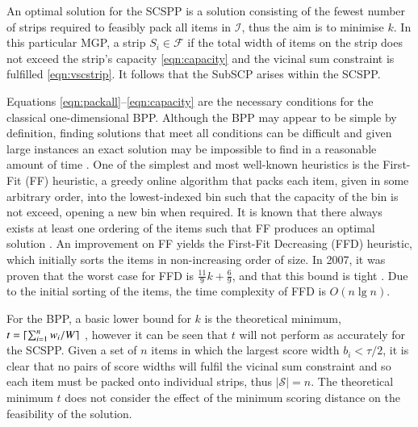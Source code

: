 \documentclass{elsarticle}
\begin{document}
\noindent An optimal solution for the SCSPP is a solution consisting of the fewest number of strips required to feasibly pack all items in $\mathcal{I}$, thus the aim is to minimise $k$. In this particular MGP, a strip $S_i \in \mathcal{F}$ if the total width of items on the strip does not exceed the strip's capacity \eqref{eqn:capacity} and the vicinal sum constraint is fulfilled \eqref{eqn:vscstrip}. It follows that the SubSCP arises within the SCSPP.

Equations \eqref{eqn:packall}--\eqref{eqn:capacity} are the necessary conditions for the classical one-dimensional BPP. Although the BPP may appear to be simple by definition, finding solutions that meet all conditions can be difficult and given large instances an exact solution may be impossible to find in a reasonable amount of time . One of the simplest and most well-known heuristics is the First-Fit (FF) heuristic, a greedy online algorithm that packs each item, given in some arbitrary order, into the lowest-indexed bin such that the capacity of the bin is not exceed, opening a new bin when required. It is known that there always exists at least one ordering of the items such that FF produces an optimal solution \cite{lewis2009}. An improvement on FF yields the First-Fit Decreasing (FFD) heuristic, which initially sorts the items in non-increasing order of size. In 2007, it was proven that the worst case for FFD is $\frac{11}{9}k + \frac{6}{9}$, and that this bound is tight \cite{dosa2007}. Due to the initial sorting of the items, the time complexity of FFD is $O(n \lg n)$. 

For the BPP, a basic lower bound for $k$ is the theoretical minimum, $t = \lceil\sum_{i=1}^{n} w_i / W\rceil$ \cite{martello1990l}, however it can be seen that $t$ will not perform as accurately for the SCSPP. Given a set of $n$ items in which the largest score width $b_i < \tau / 2$, it is clear that no pairs of score widths will fulfil the vicinal sum constraint and so each item must be packed onto individual strips, thus $|\mathcal{S}| = n$. The theoretical minimum $t$ does not consider the effect of the minimum scoring distance on the feasibility of the solution. 
\end{document}
